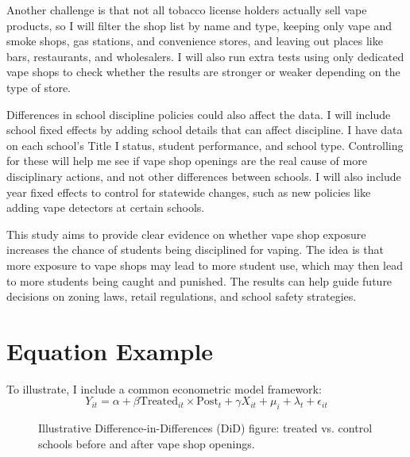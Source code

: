 \documentclass{article}
\begin{document}
Another challenge is that not all tobacco license holders actually sell vape products, so I will filter the shop list by name and type, keeping only vape and smoke shops, gas stations, and convenience stores, and leaving out places like bars, restaurants, and wholesalers. I will also run extra tests using only dedicated vape shops to check whether the results are stronger or weaker depending on the type of store.

Differences in school discipline policies could also affect the data. I will include school fixed effects by adding school details that can affect discipline. I have data on each school’s Title I status, student performance, and school type. Controlling for these will help me see if vape shop openings are the real cause of more disciplinary actions, and not other differences between schools. I will also include year fixed effects to control for statewide changes, such as new policies like adding vape detectors at certain schools.

This study aims to provide clear evidence on whether vape shop exposure increases the chance of students being disciplined for vaping. The idea is that more exposure to vape shops may lead to more student use, which may then lead to more students being caught and punished. The results can help guide future decisions on zoning laws, retail regulations, and school safety strategies.

\section*{Equation Example}
To illustrate, I include a common econometric model framework:
\[
Y_{it} = \alpha + \beta \text{Treated}_{it} \times \text{Post}_{t} + \gamma X_{it} + \mu_i + \lambda_t + \epsilon_{it}
\]

\begin{figure}[h]
\centering
{}
\caption{Illustrative Difference-in-Differences (DiD) figure: treated vs. control schools before and after vape shop openings.}
\end{figure}



\end{document}
